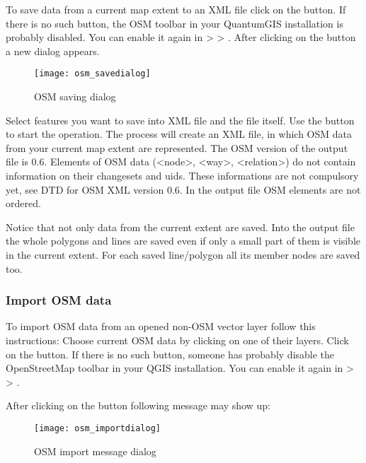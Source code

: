 To save data from a current map extent to an XML file click on the
 button. If there is no such button, 
the OSM toolbar in your QuantumGIS installation is probably disabled. You can 
enable it again in  >  >
. After clicking on the button a new dialog appears.

\begin{figure}[ht]
   \begin{center}
   \caption{OSM saving dialog \nixcaption}\label{fig:osmsave}\smallskip
   \texttt{[image: osm\_savedialog]}
\end{center}
\end{figure}

Select features you want to save into XML file and the file itself. Use 
the  button to start the operation. The process will create an 
XML file, in which OSM data from your current map extent are represented. 
The OSM version of the output file is 0.6. Elements of OSM data 
(<node>, <way>, <relation>) do not contain information on their changesets 
and uids. These informations are not compulsory yet, see DTD for
OSM XML version 0.6. In the output file OSM elements are not ordered.

Notice that not only data from the current extent are saved. Into the output 
file the whole polygons and lines are saved even if only a small part of them 
is visible in the current extent. For each saved line/polygon all its member 
nodes are saved too.

\subsubsection{Import OSM data}  

To import OSM data from an opened non-OSM vector layer follow this 
instructions: Choose current OSM data by clicking on one of their layers. 
Click on the  button. If 
there is no such button, someone has probably disable the OpenStreetMap 
toolbar in your QGIS installation. You can enable it again in 
 >  > . 

After clicking on the button following message may show up:

\begin{figure}[ht]
   \begin{center}
   \caption{OSM import message dialog \nixcaption}\label{fig:osmimportmessage}\smallskip
   \texttt{[image: osm\_importdialog]}
\end{center}
\end{figure}

